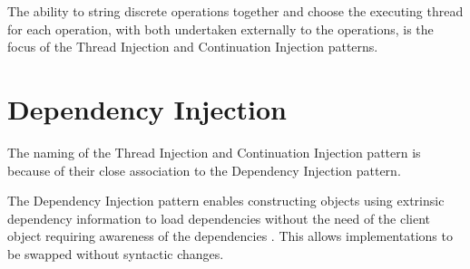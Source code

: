 \documentclass[prodmode]{style/acmlarge}
\begin{document}
\begin{table}[t]
\label{tab:example_request_operations}
\end{table}

The ability to string discrete operations together and choose the executing
thread for each operation, with both undertaken externally to the operations, is
the focus of the Thread Injection and Continuation Injection patterns.


\section{Dependency Injection}

The naming of the Thread Injection and Continuation Injection pattern is because
of their close association to the Dependency Injection pattern.

The Dependency Injection pattern enables constructing objects using extrinsic
dependency information to load dependencies without the need of the client
object requiring awareness of the dependencies \cite{ioc}.  This allows
implementations to be swapped without syntactic changes.
\end{document}
